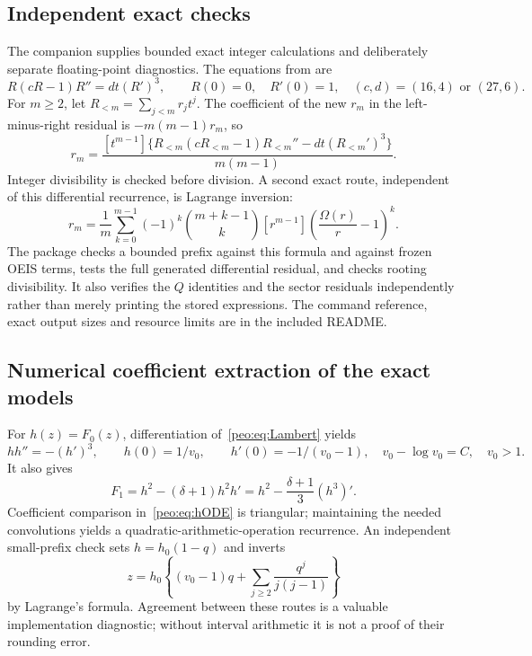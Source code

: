 \documentclass[11pt]{article}
\numberwithin{equation}{section}
\theoremstyle{remark}\newtheorem{remark}[theorem]{Remark}
\begin{document}
\subsection{Independent exact checks}
The companion supplies bounded exact integer calculations and deliberately separate floating-point diagnostics. The equations from \cite[Section 7]{BMEP} are
\begin{equation}
 R(cR-1)R''=dt(R')^3,\qquad R(0)=0,\quad R'(0)=1,
 \quad(c,d)=(16,4)\text{ or }(27,6).\label{peo:eq:ODE}
\end{equation}
For $m\ge2$, let $R_{<m}=\sum_{j<m}r_jt^j$. The coefficient of the new $r_m$ in the left-minus-right residual is $-m(m-1)r_m$, so
\begin{equation}
 r_m=\frac{[t^{m-1}]\{R_{<m}(cR_{<m}-1)R_{<m}''-dt(R_{<m}')^3\}}{m(m-1)}.
 \label{peo:eq:recurrence}
\end{equation}
Integer divisibility is checked before division. A second exact route, independent of this differential recurrence, is Lagrange inversion:
\begin{equation}
 r_m=\frac1m\sum_{k=0}^{m-1}(-1)^k\binom{m+k-1}{k}
 [r^{m-1}]\left(\frac{\Omega(r)}r-1\right)^k.
 \label{peo:eq:Lagrange}
\end{equation}
The package checks a bounded prefix against this formula and against frozen OEIS terms, tests the full generated differential residual, and checks rooting divisibility. It also verifies the $Q$ identities and the sector residuals independently rather than merely printing the stored expressions. The command reference, exact output sizes and resource limits are in the included README.

\subsection{Numerical coefficient extraction of the exact models}
For $h(z)=F_0(z)$, differentiation of~\eqref{peo:eq:Lambert} yields
\begin{equation}
 hh''=-(h')^3,\qquad h(0)=1/v_0,\qquad h'(0)=-1/(v_0-1),
 \quad v_0-\log v_0=C,\quad v_0>1.
 \label{peo:eq:hODE}
\end{equation}
It also gives
\begin{equation}
 F_1=h^2-(\delta+1)h^2h'
     =h^2-\frac{\delta+1}{3}(h^3)'.\label{peo:eq:F1h}
\end{equation}
Coefficient comparison in~\eqref{peo:eq:hODE} is triangular; maintaining the needed convolutions yields a quadratic-arithmetic-operation recurrence. An independent small-prefix check sets $h=h_0(1-q)$ and inverts
\begin{equation}
 z=h_0\left\{(v_0-1)q+\sum_{j\ge2}\frac{q^j}{j(j-1)}\right\}
 \label{peo:eq:hLagrange}
\end{equation}
by Lagrange's formula. Agreement between these routes is a valuable implementation diagnostic; without interval arithmetic it is not a proof of their rounding error.
\end{document}
